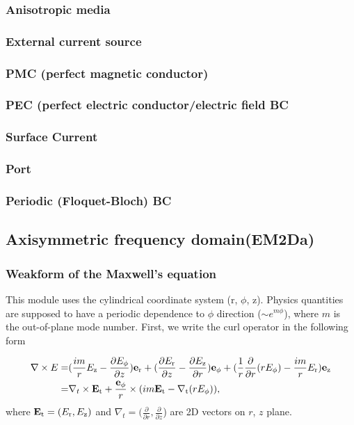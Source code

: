 \documentclass[11pt,a4paper,draft]{report}
\begin{document}
 \subsubsection{Anisotropic media}
 
 \subsubsection{External current source}
 
 \subsubsection{PMC (perfect magnetic conductor)}
 
 \subsubsection{PEC (perfect electric conductor/electric field BC}
 
  \subsubsection{Surface Current}
  
 \subsubsection{Port}
 
 \subsubsection{Periodic (Floquet-Bloch) BC}
 
\subsection{Axisymmetric frequency domain(EM2Da)}
\subsubsection{Weakform of the Maxwell's equation}
This module uses the cylindrical coordinate system (r,  $\phi$, z). Physics quantities are supposed to have a periodic dependence to 
$\phi$ direction ($\sim e^{m \phi}$), where $m$ is the out-of-plane mode number. First, we write the curl operator in the following form

 \begin{align}
 \nabla \times E = &(\frac{im}{r} E_{\rm z} - \frac{\partial E_{\phi}}{\partial z})\mathbf{e}_{\rm r} +
( \frac{\partial E_{\rm r}}{\partial z} - \frac{\partial E_{\rm z}}{\partial r})\mathbf{e}_{\rm \phi}+
 (\frac{1}{r}\frac{\partial }{\partial r}(r E_{\phi}) - \frac{im}{r} E_{\rm r} )\mathbf{e}_{\rm z} 
 \notag \\ 
 = &\nabla_{t} \times \mathbf{E}_{\rm t} + \frac{\mathbf{e}_{\rm \phi}}{r} \times (im \mathbf{E}_{\rm t} - \nabla_{\rm t} (rE_{\rm \phi}) ),
 \end{align}
 where $\mathbf{E}_{\rm t} = (E_{\rm r}, E_{\rm z})$ and  $\nabla_{t} = (\frac{\partial }{\partial r}, \frac{\partial }{\partial z}$) are 2D vectors on $r$, $z$ plane.
 
\end{document}

